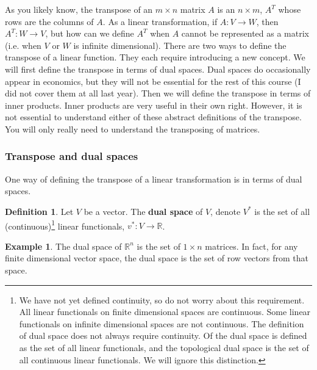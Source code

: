 \documentclass[12pt,reqno]{amsart}
\def\R{\mathbb{R}}
\theoremstyle{definition}
\newtheorem{definition}{Definition}[section]
\newtheorem{example}{Example}[section]
\begin{document}
As you likely know, the transpose of an $m \times n$ matrix $A$ is an
$n \times m$, $A^T$ whose rows are the columns of $A$. As a linear
transformation, if $A: V \to W$, then $A^T: W \to V$, but how can we
define $A^T$ when $A$ cannot be represented as a matrix (i.e. when $V$
or $W$ is infinite dimensional). There are two ways to define the
transpose of a linear function. They each require introducing a new
concept. We will first define the transpose in terms of dual
spaces. Dual spaces do occasionally appear in economics, but they will
not be essential for the rest of this course (I did not cover them at
all last year). Then we will define the transpose in terms of inner
products. Inner products are very useful in their own right. However,
it is not essential to understand either of these abstract definitions
of the transpose. You will only really need to understand the
transposing of matrices.

\subsubsection{Transpose and dual spaces}

One way of defining the transpose of a linear transformation is in
terms of dual spaces.
\begin{definition}
  Let $V$ be a vector. The \textbf{dual space} of $V$, denote $V^\ast$
  is the set of all (continuous)\footnote{We have not yet defined
    continuity, so do not worry about this requirement. All linear
    functionals on finite dimensional spaces are continuous. Some
    linear functionals on infinite dimensional spaces are not
    continuous. The definition of dual space does not always require
    continuity. Of the dual space is defined as the set of all linear
    functionals, and the topological dual space is the set of all
    continuous linear functionals. We will ignore this distinction.}
  linear functionals, $v^\ast: V \to \R$.
\end{definition}

\begin{example}
  The dual space of $\R^n$ is the set of $1 \times n$ matrices. In
  fact, for any finite dimensional vector space, the dual space is the
  set of row vectors from that space. 
\end{example}
\end{document}
